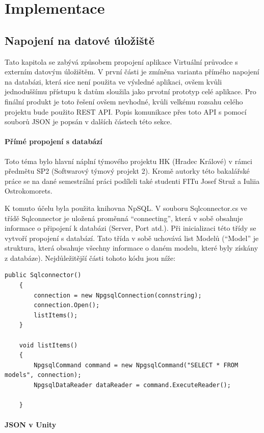 \documentclass[thesis=B,czech]{FITthesis}[2012/06/26]
\begin{document}
\chapter{Implementace}

	\section{Napojení na datové úložiště}
		    Tato kapitola se zabývá způsobem propojení aplikace Virtuální průvodce s externím datovým úložištěm. V první části je zmíněna varianta přímého napojení na databázi, která sice není použita ve výsledné aplikaci, ovšem kvůli jednoduššímu přístupu k datům sloužila jako prvotní prototyp celé aplikace. Pro finální produkt je toto řešení ovšem nevhodné, kvůli velkému rozsahu celého projektu bude použito REST API. Popis komunikace přes toto API s pomocí souborů JSON je popsán v dalších částech této sekce.
    

\subsubsection{Přímé propojení s databází}
 Toto téma bylo hlavní náplní týmového projektu HK (Hradec Králové) v rámci předmětu SP2 (Softwarový týmový projekt 2). Kromě autorky této bakalářské práce se na dané semestrální práci podíleli také studenti FITu Josef Struž a Iuliia Ostrokomorets. 
   
    K tomuto účelu byla použita knihovna NpSQL. V souboru Sqlconnector.cs ve třídě Sqlconnector je uložená proměnná “connecting”, která v sobě obsahuje informace o připojení k databázi (Server, Port atd.). Při inicializaci této třídy se vytvoří propojení s databází. Tato třída v sobě uchovává list Modelů (“Model” je struktura, která obsahuje všechny informace o daném modelu, které byly získány z databáze). Nejdůležitější části tohoto kódu jsou níže:
    \begin{lstlisting}[frame=single]
    public Sqlconnector()
    {
        connection = new NpgsqlConnection(connstring);
        connection.Open();
        listItems();              
    }

    void listItems()
    {
        NpgsqlCommand command = new NpgsqlCommand("SELECT * FROM models", connection);
        NpgsqlDataReader dataReader = command.ExecuteReader();
        
    }
	\end{lstlisting}
    
    \subsubsection{JSON v Unity}
	
\end{document}
